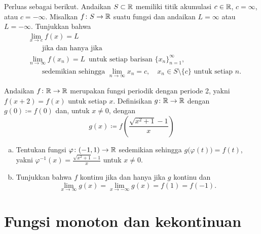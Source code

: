 \begin{exercise}
Perluas  sebagai berikut.
Andaikan $S \subset {\mathbb{R}}$ memiliki titik akumulasi $c \in {\mathbb{R}}$, $c = \infty$,
atau $c = -\infty$.  Misalkan $f \colon S \to {\mathbb{R}}$ suatu fungsi dan andaikan
$L = \infty$ atau $L = -\infty$.  Tunjukkan bahwa
\begin{equation*}
\begin{aligned}
&
\lim_{x\to c} f(x) = L
\\
&
\qquad \text{jika dan hanya jika}
\\
&
\lim_{n\to\infty} f(x_n) = L \enspace \text{untuk setiap barisan }
\{ x_n \}_{n=1}^\infty, \\
& \qquad \text{sedemikian sehingga } \lim_{n\to\infty} x_n = c, \quad
x_n \in S \setminus \{c\} \text{ untuk setiap } n  .
\end{aligned}
\end{equation*}
\end{exercise}

\begin{exercise}
Andaikan $f \colon {\mathbb{R}} \to {\mathbb{R}}$ merupakan fungsi periodik dengan periode 2, yakni $f(x + 2) =
f(x)$ untuk setiap $x$.  Definisikan $g \colon {\mathbb{R}} \to {\mathbb{R}}$ dengan 
$g(0) \coloneqq f(0)$ dan, untuk $x \neq 0$, dengan
\begin{equation*}
g(x) \coloneqq f\left(\frac{\sqrt{x^2+1}-1}{x}\right)
\end{equation*}
\begin{enumerate}[a)]
\item
Tentukan fungsi $\varphi \colon (-1,1) \to {\mathbb{R}}$ sedemikian sehingga
$g\bigl(\varphi(t)\bigr) = f(t)$, yakni $\varphi^{-1}(x) = 
\frac{\sqrt{x^2+1}-1}{x}$ untuk $x \neq 0$.
\item
Tunjukkan bahwa $f$ kontinu jika dan hanya jika $g$ kontinu dan
\begin{equation*}
\lim_{x \to \infty} g(x) = 
\lim_{x \to -\infty} g(x) = 
f(1) = f(-1) .
\end{equation*}
\end{enumerate}
\end{exercise}


\sectionnewpage
\section{Fungsi monoton dan kekontinuan}
\label{sec:monotonefunc}

